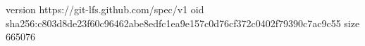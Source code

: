 version https://git-lfs.github.com/spec/v1
oid sha256:c803d8de23f60c96462abe8edfc1ea9e157c0d76cf372c0402f79390c7ac9c55
size 665076
